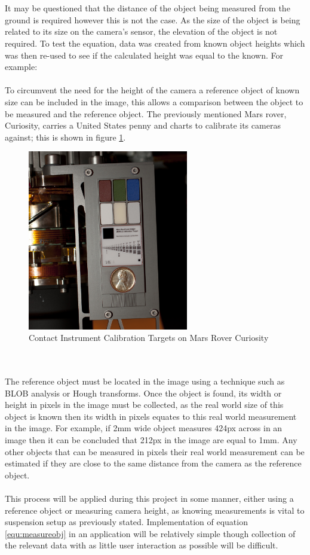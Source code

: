 	\\\\
	It may be questioned that the distance of the object being measured from the ground is required however this is not the case. As the size of the object is being related to its size on the camera's sensor, the elevation of the object is not required. To test the equation, data was created from known object heights which was then re-used to see if the calculated height was equal to the known. For example: 
	\\\\
	To circumvent the need for the height of the camera a reference object of known size can be included in the image, this allows a comparison between the object to be measured and the reference object. The previously mentioned Mars rover, Curiosity, carries a United States penny and charts to calibrate its cameras against; this is shown in figure \ref{fig:curiosity_calibration_chart}.
	\begin{figure}[h!]
		\centering
		\includegraphics[width=7cm]{../images/curiosity_calibration_chart.jpg}
		\caption{Contact Instrument Calibration Targets on Mars Rover Curiosity \citep{curiosity_image_calibration}}
		\label{fig:curiosity_calibration_chart}
	\end{figure}\\\\
	The reference object must be located in the image using a technique such as BLOB analysis or Hough transforms. Once the object is found, its width or height in pixels in the image must be collected, as the real world size of this object is known then its width in pixels equates to this real world measurement in the image. For example, if 2mm wide object measures 424px across in an image then it can be concluded that 212px in the image are equal to 1mm. Any other objects that can be measured in pixels their real world measurement can be estimated if they are close to the same distance from the camera as the reference object.
	\\\\
	This process will be applied during this project in some manner, either using a reference object or measuring camera height, as knowing measurements is vital to suspension setup as previously stated. Implementation of equation \ref{equ:measureobj} in an application will be relatively simple though collection of the relevant data with as little user interaction as possible will be difficult.